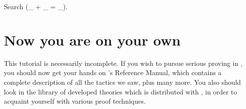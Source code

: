 \documentclass[11pt,a4paper]{book}
\begin{document}
\begin{coq_example}
Search (_ + _ = _).
\end{coq_example}

\section{Now you are on your own}

This tutorial is necessarily incomplete. If you wish to pursue serious
proving in \Coq, you should now get your hands on \Coq's Reference Manual,
which contains a complete description of all the tactics we saw,
plus many more.
You also should look in the library of developed theories which is distributed
with \Coq, in order to acquaint yourself with various proof techniques.
\end{document}
